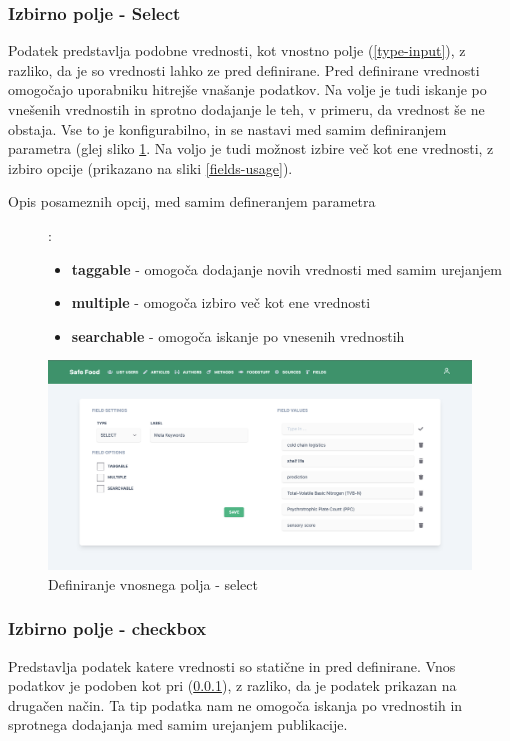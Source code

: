 \documentclass[a4paper, 12pt]{book}
\begin{document}
\subsubsection{Izbirno polje - Select}
\label{type-select-page}
Podatek predstavlja podobne vrednosti, kot vnostno polje  (\ref{type-input}), z razliko, da je so vrednosti lahko ze pred definirane. Pred definirane vrednosti omogočajo uporabniku hitrejše vnašanje podatkov. Na volje je tudi iskanje po vnešenih vrednostih in sprotno dodajanje le teh, v primeru, da vrednost še ne obstaja. Vse to je konfigurabilno, in se nastavi med samim definiranjem parametra (glej sliko \ref{type-select}. Na voljo je tudi možnost izbire več kot ene vrednosti, z izbiro opcije  (prikazano na sliki \ref{fields-usage}). 


\begin{description}
\item[Opis posameznih opcij, med samim defineranjem parametra]:
	\begin{itemize}
		\item \textbf{taggable} - omogoča dodajanje novih vrednosti med samim urejanjem
		\item \textbf{multiple} - omogoča izbiro več kot ene vrednosti
		\item \textbf{searchable} - omogoča iskanje po vnesenih vrednostih
	\end{itemize}
\end{description}

\begin{figure}[H]
\begin{center}
\includegraphics[width=1\textwidth]{slike/type_select.png}
\end{center}
\caption{ Definiranje vnosnega polja - select }
\label{type-select}
\end{figure}


\subsubsection{Izbirno polje - checkbox}
\label{type-checkbox-page}
Predstavlja podatek katere vrednosti so statične in pred definirane. Vnos podatkov je podoben kot pri  (\ref{type-select-page}), z razliko, da je podatek prikazan na drugačen način. Ta tip podatka nam ne omogoča iskanja po vrednostih in sprotnega dodajanja med samim urejanjem publikacije.
\end{document}
